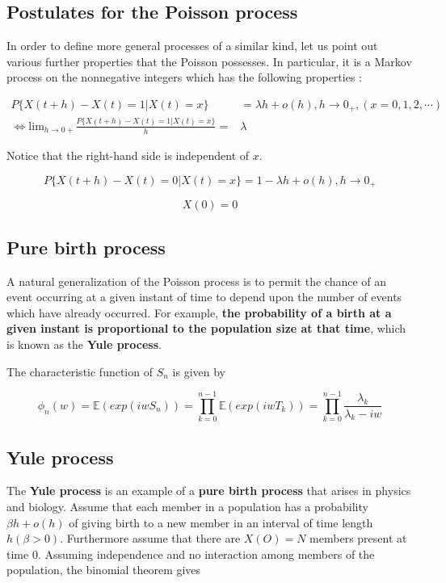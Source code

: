 \documentclass[12pt]{article}
\theoremstyle{nonumberbreak}
\begin{document}
\subsection{Postulates for the Poisson process}

In order to define more general processes of a similar kind, let us point out various further properties that the Poisson possesses. In particular, it is a Markov process on the nonnegative integers which has the following properties :


$$
\begin{aligned}
P\{ X(t+h) - X(t) = 1 | X(t) = x \} &= \lambda h + o(h), h \to 0_+, (x=0,1,2,\cdots) \\[10pt]
\Leftrightarrow \mathrm{lim}_{h \to 0+} \frac{P\{ X(t+h) - X(t) = 1 | X(t) = x \}}{h} = &\lambda
\end{aligned}
$$

Notice that the right-hand side is independent of $x$. 


$$
P\{ X(t+h) - X(t) = 0 | X(t) = x \} = 1 - \lambda h + o(h), h \to 0_+
$$

$$
X(0) = 0 
$$


\subsection{Pure birth process}

A natural generalization of the Poisson process is to permit the chance of an event occurring at a given instant of time to depend upon the number of events which have already occurred. For example, \textbf{the probability of a birth at a given instant is proportional to the population size at that time}, which is known as the \textbf{Yule process}.


The characteristic function of $S_n$ is given by

$$
\phi_n(w) = \mathbb{E}(exp(iwS_n)) = \prod_{k=0}^{n-1} \mathbb{E}(exp(iw T_k)) = \prod_{k=0}^{n-1} \frac{\lambda_k}{\lambda_k - iw}
$$


\subsection{Yule process}

The \textbf{Yule process} is an example of a \textbf{pure birth process} that arises in physics and biology. Assume that each member in a population has a probability $\beta h + o(h)$ of giving birth to a new member in an interval of time length $h (\beta > 0)$. Furthermore assume that there are $X(O) = N$ members present at time $0$. Assuming independence and no interaction among members of the population, the binomial theorem gives
\end{document}
